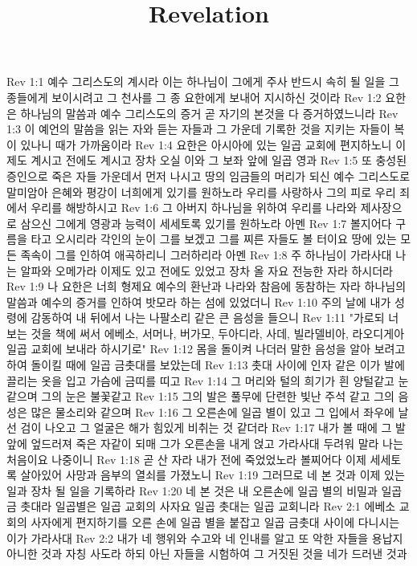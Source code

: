 

\title{Revelation}

Rev 1:1  예수 그리스도의 계시라 이는 하나님이 그에게 주사 반드시 속히 될 일을 그 종들에게 보이시려고 그 천사를 그 종 요한에게 보내어 지시하신 것이라
Rev 1:2  요한은 하나님의 말씀과 예수 그리스도의 증거 곧 자기의 본것을 다 증거하였느니라
Rev 1:3  이 예언의 말씀을 읽는 자와 듣는 자들과 그 가운데 기록한 것을 지키는 자들이 복이 있나니 때가 가까움이라
Rev 1:4  요한은 아시아에 있는 일곱 교회에 편지하노니 이제도 계시고 전에도 계시고 장차 오실 이와 그 보좌 앞에 일곱 영과
Rev 1:5  또 충성된 증인으로 죽은 자들 가운데서 먼저 나시고 땅의 임금들의 머리가 되신 예수 그리스도로 말미암아 은혜와 평강이 너희에게 있기를 원하노라 우리를 사랑하사 그의 피로 우리 죄에서 우리를 해방하시고
Rev 1:6  그 아버지 하나님을 위하여 우리를 나라와 제사장으로 삼으신 그에게 영광과 능력이 세세토록 있기를 원하노라 아멘
Rev 1:7  볼지어다 구름을 타고 오시리라 각인의 눈이 그를 보겠고 그를 찌른 자들도 볼 터이요 땅에 있는 모든 족속이 그를 인하여 애곡하리니 그러하리라 아멘
Rev 1:8  주 하나님이 가라사대 나는 알파와 오메가라 이제도 있고 전에도 있었고 장차 올 자요 전능한 자라 하시더라
Rev 1:9  나 요한은 너희 형제요 예수의 환난과 나라와 참음에 동참하는 자라 하나님의 말씀과 예수의 증거를 인하여 밧모라 하는 섬에 있었더니
Rev 1:10  주의 날에 내가 성령에 감동하여 내 뒤에서 나는 나팔소리 같은 큰 음성을 들으니
Rev 1:11  "가로되 너 보는 것을 책에 써서 에베소, 서머나, 버가모, 두아디라, 사데, 빌라델비아, 라오디게아 일곱 교회에 보내라 하시기로"
Rev 1:12  몸을 돌이켜 나더러 말한 음성을 알아 보려고 하여 돌이킬 때에 일곱 금촛대를 보았는데
Rev 1:13  촛대 사이에 인자 같은 이가 발에 끌리는 옷을 입고 가슴에 금띠를 띠고
Rev 1:14  그 머리와 털의 희기가 흰 양털같고 눈 같으며 그의 눈은 불꽃같고
Rev 1:15  그의 발은 풀무에 단련한 빛난 주석 같고 그의 음성은 많은 물소리와 같으며
Rev 1:16  그 오른손에 일곱 별이 있고 그 입에서 좌우에 날선 검이 나오고 그 얼굴은 해가 힘있게 비취는 것 같더라
Rev 1:17  내가 볼 때에 그 발 앞에 엎드러져 죽은 자같이 되매 그가 오른손을 내게 얹고 가라사대 두려워 말라 나는 처음이요 나중이니
Rev 1:18  곧 산 자라 내가 전에 죽었었노라 볼찌어다 이제 세세토록 살아있어 사망과 음부의 열쇠를 가졌노니
Rev 1:19  그러므로 네 본 것과 이제 있는 일과 장차 될 일을 기록하라
Rev 1:20  네 본 것은 내 오른손에 일곱 별의 비밀과 일곱 금 촛대라 일곱별은 일곱 교회의 사자요 일곱 촛대는 일곱 교회니라
Rev 2:1  에베소 교회의 사자에게 편지하기를 오른 손에 일곱 별을 붙잡고 일곱 금촛대 사이에 다니시는 이가 가라사대
Rev 2:2  내가 네 행위와 수고와 네 인내를 알고 또 악한 자들을 용납지 아니한 것과 자칭 사도라 하되 아닌 자들을 시험하여 그 거짓된 것을 네가 드러낸 것과
